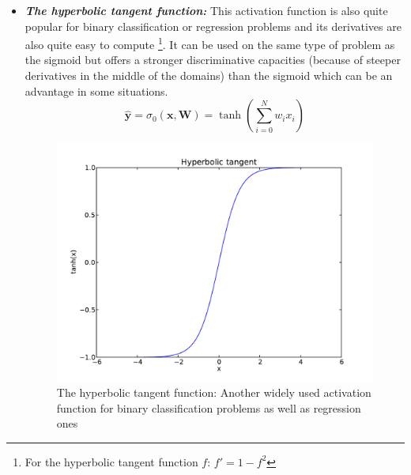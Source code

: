 \documentclass[a4paper,11pt]{report}
\newcommand{\Important}[1]{\textbf{{\em #1}}}
\begin{document}
\begin{itemize}
				\item \Important{The hyperbolic tangent function:} This activation function is also quite popular for binary classification or regression problems and its derivatives are also quite easy to compute \footnote{For the hyperbolic tangent function $f$: $f'= 1 - f^{2}$}. It can be used on the same type of problem as the sigmoid but offers a stronger discriminative capacities (because of steeper derivatives in the middle of the domains) than the sigmoid which can be an advantage in some situations.\\
				\begin{equation}
					\mathbf{\hat{y}} = \sigma_{0}(\mathbf{x}, \mathbf{W}) = \tanh\left(\sum_{i=0}^{N} w_{i} x_{i}\right)
				\end{equation}
				\begin{figure}[H]
					\begin{center}
						\includegraphics[width=3 in]{Images/NN/tanh.pdf}
						\caption[Activation function: The hyperbolic tangent]{The hyperbolic tangent function: Another widely used activation function for binary classification problems as well as regression ones}
						\label{fig:The hyperbolic tangent function}
					\end{center}
				\end{figure}  
       

\end{itemize}
\end{document}

